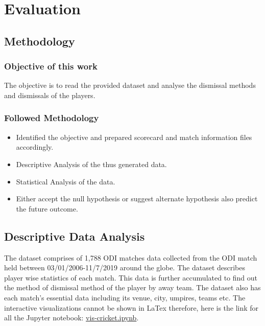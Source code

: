 \documentclass[fleqn,10pt]{wlscirep}
\begin{document}
\section{Evaluation}
\subsection{Methodology}
\subsubsection{Objective of this work}
The objective is to read the provided dataset and analyse the dismissal methods and dismissals of the players.
\subsubsection{Followed Methodology}
\begin{itemize}
    \item Identified the objective and prepared scorecard and match information files accordingly.
    \item Descriptive Analysis of the thus generated data.
    \item Statistical Analysis of the data.
    \item Either accept the null hypothesis or suggest alternate hypothesis also predict the future outcome.
\end{itemize}
\subsection{Descriptive Data Analysis}
The dataset comprises of 1,788 ODI matches data collected from the ODI match held between 03/01/2006-11/7/2019 around the globe. 
The dataset describes player wise statistics of each match. This data is further accumulated to find out the 
method of dismissal method of the player by away team. 
The dataset also has each match's essential data including its venue, city, umpires, teams etc.
The interactive visualizations cannot be shown in LaTex therefore, here is the link for all the Jupyter notebook: \href{https://nbviewer.jupyter.org/github/dev-SB/cricket-bi/blob/master/vis-cricket.ipynb}{vis-cricket.ipynb}.
\end{document}

